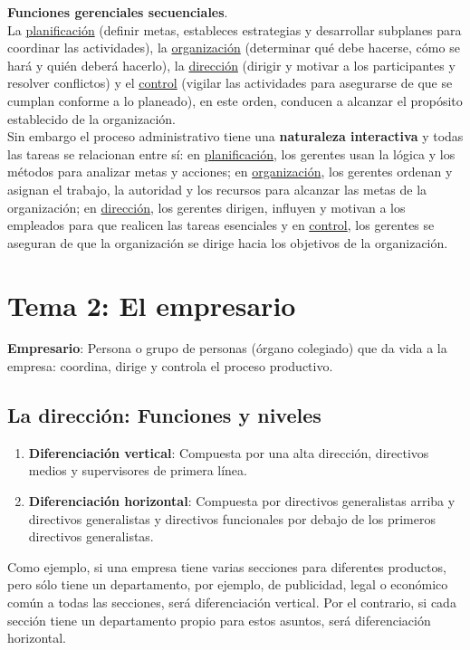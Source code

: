 \documentclass[12pt]{article}
\theoremstyle{definition_wo_parentheses}
\begin{document}
\textbf{Funciones gerenciales secuenciales}.\\
La \underline{planificación} (definir metas, estableces estrategias y desarrollar subplanes para coordinar las actividades), la \underline{organización} (determinar qué debe hacerse, cómo se hará y quién deberá hacerlo), la \underline{dirección} (dirigir y motivar a los participantes y resolver conflictos) y el \underline{control} (vigilar las actividades para asegurarse de que se cumplan conforme a lo planeado), en este orden, conducen a alcanzar el propósito establecido de la organización.\\

Sin embargo el proceso administrativo tiene una \textbf{naturaleza interactiva} y todas las tareas se relacionan entre sí: en \underline{planificación}, los gerentes usan la lógica y los métodos para analizar metas y acciones; en \underline{organización}, los gerentes ordenan y asignan el trabajo, la autoridad y los recursos para alcanzar las metas de la organización; en \underline{dirección}, los gerentes dirigen, influyen y motivan a los empleados para que realicen las tareas esenciales y en \underline{control}, los gerentes se aseguran de que la organización se dirige hacia los objetivos de la organización.

\section{Tema 2: El empresario}
\textbf{Empresario}: Persona o grupo de personas (órgano colegiado) que da vida a la empresa: coordina, dirige y controla el proceso productivo.

\subsection{La dirección: Funciones y niveles}
\begin{enumerate}
\item \textbf{Diferenciación vertical}: Compuesta por una alta dirección, directivos medios y supervisores de primera línea. 
\item \textbf{Diferenciación horizontal}: Compuesta por directivos generalistas arriba y directivos generalistas y directivos funcionales por debajo de los primeros directivos generalistas.
\end{enumerate}

	Como ejemplo, si una empresa tiene varias secciones para diferentes productos, pero sólo tiene un departamento, por ejemplo, de publicidad, legal o económico común a todas las secciones, será diferenciación vertical. Por el contrario, si cada sección tiene un departamento propio para estos asuntos, será diferenciación horizontal.
\end{document}
